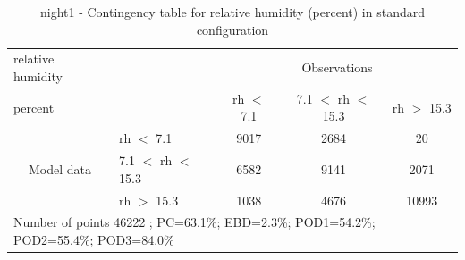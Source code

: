 \begin{table}[p!]
\begin{center}
\begin{tabular}{llccc}
\hline
{relative humidity}                                       &                                                    & \multicolumn{3}{c}{Observations}                 \\
{percent}                                       &                             & rh $<$ 7.1   & 7.1 $<$ rh $<$ 15.3 & rh $>$ 15.3 \\
\hline
\multicolumn{1}{c}{\multirow{3}{*}{Model data}}  & rh $<$ 7.1             & 9017                & 2684                       & 20              \\
                                                 & 7.1  $<$ rh $<$ 15.3 & 6582                & 9141                       & 2071              \\
                                                 & rh $>$ 15.3             & 1038                & 4676                       & 10993              \\
\hline
\multicolumn{5}{l}{ Number of points        46222 ; PC=63.1\%; EBD=2.3\%; POD1=54.2\%; POD2=55.4\%; POD3=84.0\%}
\end{tabular}
\end{center}
\caption{night1 - Contingency table for  relative humidity (percent) in standard configuration}
\label{tab:contingencyrhBEF:night1}
\end{table}
